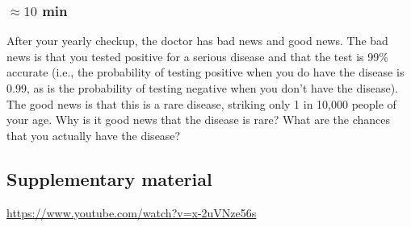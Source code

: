 \documentclass[a4paper, 10pt]{article}
\begin{document}
    \subsubsection{$\approx 10$ min}
    After your yearly checkup, the doctor has bad news and good news. The bad news
is that you tested positive for a serious disease and that the test is 99\% accurate (i.e., the
probability of testing positive when you do have the disease is 0.99, as is the probability of
testing negative when you don’t have the disease). The good news is that this is a rare disease,
striking only 1 in 10,000 people of your age. Why is it good news that the disease is rare?
What are the chances that you actually have the disease?

   \subsection{Supplementary material}
   \url{https://www.youtube.com/watch?v=x-2uVNze56s}
   
 
   
   
\end{document}
